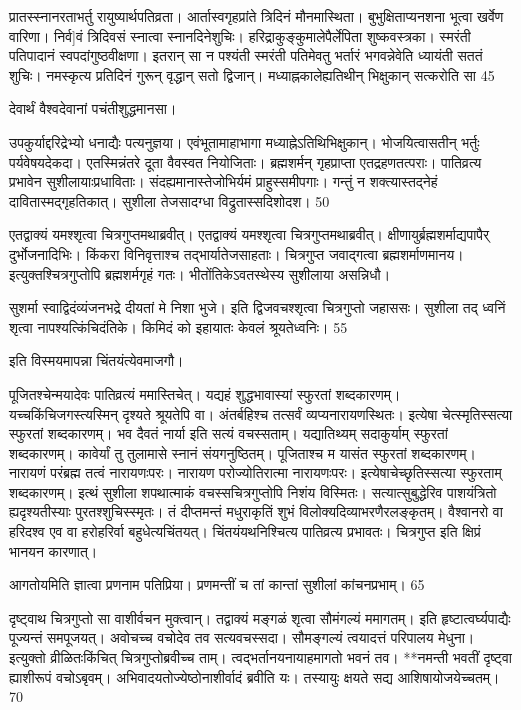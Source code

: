 प्रातस्स्नानरताभर्तु रायुष्यार्थपतिव्रता।
आर्तास्वगृहप्रांते त्रिदिनं मौनमास्थिता।
बुभुक्षिताप्यनशना भूत्वा खर्वेण वारिणा।
निर्व]वं त्रिदिवसं स्नात्वा स्नानदिनेशुचिः।
हरिद्राकुङ्कुमालेपैर्लेपिता शुष्कवस्त्रका।
स्मरंती पतिपादानं स्वपदांगुष्ठवीक्षणा।
इतरान् सा न पश्यंती स्मरंती पतिमेवतु भर्तारं भगवन्नेवेति ध्यायंती सततं शुचिः।
नमस्कृत्य प्रतिदिनं गुरून् वृद्धान् सतो द्विजान्।
मध्याह्नकालेह्यतिथीन् भिक्षुकान् सत्करोति सा 45

देवार्थं वैश्वदेवानां पचंतीशुद्धमानसा।

उपकुर्याद्दरिद्रेभ्यो धनाद्यैः पत्यनुज्ञया।
एवंभूतामाहाभागा मध्याह्नेऽतिथिभिक्षुकान्।
भोजयित्वासतीन् भर्तुः पर्यवेषयदेकदा।
एतस्मिन्नंतरे दूता वैवस्वत नियोजिताः।
ब्रह्मशर्मन् गृहप्राप्ता एतद्रहणतत्पराः।
पातिव्रत्य प्रभावेन सुशीलायाःप्रधाविताः।
संदह्यमानास्तेजोभिर्यमं प्राहुस्समीपगाः।
गन्तुं न शक्त्यास्तद्नेहं दावितास्मद्गृहतिकात्।
सुशीला तेजसादग्धा विद्रुतास्सदिशोदश।
50

एतद्वाक्यं यमश्शृत्वा चित्रगुप्तमथाब्रवीत्।
एतद्वाक्यं यमश्शृत्वा चित्रगुप्तमथाब्रवीत्।
क्षीणायुर्ब्रह्मशर्माद्यपापैर् दुर्भोजनादिभिः।
किंकरा विनिवृत्ताश्च तद्भार्यातेजसाहताः।
चित्रगुप्त जवाद्गत्वा ब्रह्मशर्माणमानय।
इत्युक्तश्चित्रगुप्तोपि ब्रह्मशर्मगृहं गतः।
भीतोंतिकेऽवतस्थेस्य सुशीलाया असन्निधौ।

सुशर्मा
स्वाद्विदंव्यंजनभद्रे दीयतां मे निशा भुजे।
इति द्विजवचश्शृत्वा चित्रगुप्तो जहाससः।
सुशीला तद् ध्वनिं शृत्वा नापश्यत्किंचिदंतिके।
किमिदं को इहायातः केवलं श्रूयतेध्वनिः।
55

इति विस्मयमापन्ना चिंतयंत्येवमाजगौ।

पूजितश्चेन्मयादेवः पातिव्रत्यं ममास्तिचेत्।
यद्यहं शुद्धभावास्यां स्फुरतां शब्दकारणम्।
यच्चकिंचिजगस्त्यस्मिन् दृश्यते श्रूयतेपि वा।
अंतर्बहिश्च तत्सर्वं व्यप्यनारायणस्थितः।
इत्येषा चेत्स्मृतिस्सत्या स्फुरतां शब्दकारणम्।
भव दैवतं नार्या इति सत्यं वचस्सताम्।
यद्यातिथ्यम् सदाकुर्याम् स्फुरतां शब्दकारणम्।
कावेर्यां तु तुलामासे स्नानं संयगनुष्ठितम्।
पूजिताश्च म यासंत स्फुरतां शब्दकारणम्।
नारायणं परंब्रह्म तत्वं नारायणःपरः।
नारायण परोज्योतिरात्मा नारायणःपरः।
इत्येषाचेच्छृतिस्सत्या स्फुरताम् शब्दकारणम्।
इत्थं सुशीला शपथात्माकं
वचस्सचित्रगुप्तोपि निशंय विस्मितः।
सत्यात्सुबुद्धेरिव पाशयंत्रितो
ह्यदृश्यतीस्याः पुरतश्शुचिस्स्मृतः।
तं दीप्तमन्तं मधुराकृतिं
शुभं विलोक्यदिव्याभरणैरलङ्कृतम्।
वैश्वानरो वा हरिदश्व एव वा
हरोहरिर्वा बहुधेत्यचिंतयत्।
चिंतयंयथनिश्चित्य पातिव्रत्य प्रभावतः।
चित्रगुप्त इति क्षिप्रं भानयन कारणात्।

आगतोयमिति ज्ञात्वा प्रणनाम पतिप्रिया।
प्रणमन्तीं च तां कान्तां सुशीलां कांचनप्रभाम्।
65

दृष्ट्वाथ चित्रगुप्तो सा वाशीर्वचन मुक्त्वान्।
तद्वाक्यं मङ्गळं शृत्वा सौमंगल्यं ममागतम्।
इति हृष्टात्वर्घ्यपाद्यैः पूज्यन्तं समपूजयत्।
अवोचच्च वचोदेव तव सत्यवचस्सदा।
सौमङ्गल्यं त्वयादत्तं परिपालय मेधुना।
इत्युक्तो व्रीळितःकिंचित् चित्रगुप्तोब्रवीच्च ताम्।
त्वद्भर्तानयनायाहमागतो भवनं तव।
**नमन्ती भवतीं दृष्ट्वा ह्याशीरूपं वचोऽबृवम्।
अभिवादयतोज्येष्ठोनाशीर्वादं ब्रवीति यः।
तस्यायुः क्षयते सद्य आशिषायोजयेच्चतम्।
70

